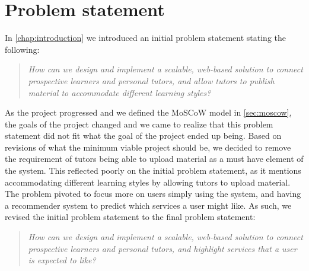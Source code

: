 \section{Problem statement}
In \autoref{chap:introduction} we introduced an initial problem statement stating the following:
\begin{quote}
    \textit{How can we design and implement a scalable, web-based solution to connect prospective learners and personal tutors, and allow tutors to publish material to accommodate different learning styles?}
\end{quote}
As the project progressed and we defined the MoSCoW model in \autoref{sec:moscow}, the goals of the project changed and we came to realize that this problem statement did not fit what the goal of the project ended up being.
Based on revisions of what the minimum viable project should be, we decided to remove the requirement of tutors being able to upload material as a must have element of the system.
This reflected poorly on the initial problem statement, as it mentions accommodating different learning styles by allowing tutors to upload material.
The problem pivoted to focus more on users simply using the system, and having a recommender system to predict which services a user might like.
As such, we revised the initial problem statement to the final problem statement:
\begin{quote}
    \textit{How can we design and implement a scalable, web-based solution to connect prospective learners and personal tutors, and highlight services that a user is expected to like?}
\end{quote}
